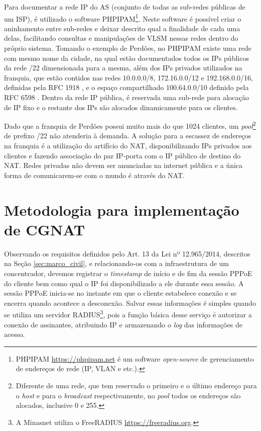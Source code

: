    Para documentar a rede IP do AS (conjunto de todas as sub-redes públicas de um ISP), é utilizado o software PHPIPAM\footnote{PHPIPAM \url{https://phpipam.net} é um software \textit{open-source} de gerenciamento de endereços de rede (IP, VLAN e etc.).}. Neste software é possível criar o aninhamento entre sub-redes e deixar descrito qual a finalidade de cada uma delas, facilitando consultas e manipulações de VLSM nessas redes dentro do próprio sistema. Tomando o exemplo de Perdões, no PHPIPAM existe uma rede com mesmo nome da cidade, na qual estão documentados todos os IPs públicos da rede /22 dimensionada para a mesma, além dos IPs privados utilizados na franquia, que estão contidos nas redes 10.0.0.0/8, 172.16.0.0/12 e 192.168.0.0/16, definidas pela RFC 1918 \cite{rfc1918}, e o espaço compartilhado 100.64.0.0/10 definido pela RFC 6598 \cite{rfc6598}. Dentro da rede IP pública, é reservada uma sub-rede para alocação de IP fixo e o restante dos IPs são alocados dinamicamente para os clientes.
   
   Dado que a franquia de Perdões possui muito mais do que 1024 clientes, um \textit{pool}\footnote{Diferente de uma rede, que tem reservado o primeiro e o último endereço para o \textit{host} e para o \textit{broadcast} respectivamente, no \textit{pool} todos os endereços são alocados, inclusive 0 e 255.} de prefixo /22 não atenderia à demanda. A solução para a escassez de endereços na franquia é a utilização do artifício do NAT, disponibilizando IPs privados aos clientes e fazendo associação do par IP-porta com o IP público de destino do NAT. Redes privadas não devem ser anunciadas na internet pública e a única forma de comunicarem-se com o mundo é através do NAT. 
   
\section{Metodologia para implementação de CGNAT}

   Observando os requisitos definidos pelo Art. 13 da Lei nº 12.965/2014, descritos na Seção \ref{sec:marco_civil}, e relacionando-os com a infraestrutura de um concentrador, devemos registrar o \textit{timestamp} de início e de fim da sessão PPPoE do cliente bem como qual o IP foi disponibilizado a ele durante essa sessão. A sessão PPPoE inicia-se no instante em que o cliente estabelece conexão e se encerra quando acontece a desconexão. Salvar essas informações é simples quando se utiliza um servidor RADIUS\footnote{A Minasnet utiliza o FreeRADIUS \url{https://freeradius.org}.}, pois a função básica desse serviço é autorizar a conexão de assinantes, atribuindo IP e armazenando o \textit{log} das informações de acesso. 

